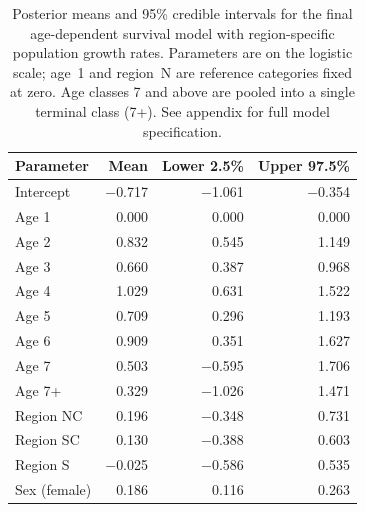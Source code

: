 
\begin{table}[!htbp]
  \centering
  \captionsetup{font=scriptsize}
  \caption{Posterior means and 95\% credible intervals for the final
    age-dependent survival model with region-specific population
    growth rates. Parameters are on the logistic scale; age~1 and
    region~N are reference categories fixed at zero. Age classes 7 and
    above are pooled into a single terminal class (7+). See appendix
    for full model specification.}
  \label{table:param}
  \scriptsize
  \begin{tabular}{lrrr}
    \toprule
    Parameter    & Mean     & Lower 2.5\% & Upper 97.5\% \\
    \midrule
    Intercept    & $-$0.717 & $-$1.061    & $-$0.354     \\
    \midrule
    Age 1        & 0.000    & 0.000       & 0.000        \\
    Age 2        & 0.832    & 0.545       & 1.149        \\
    Age 3        & 0.660    & 0.387       & 0.968        \\
    Age 4        & 1.029    & 0.631       & 1.522        \\
    Age 5        & 0.709    & 0.296       & 1.193        \\
    Age 6        & 0.909    & 0.351       & 1.627        \\
    Age 7        & 0.503    & $-$0.595    & 1.706        \\
    Age 7+       & 0.329    & $-$1.026    & 1.471        \\
    \midrule
    Region NC    & 0.196    & $-$0.348    & 0.731        \\
    Region SC    & 0.130    & $-$0.388    & 0.603        \\
    Region S     & $-$0.025 & $-$0.586    & 0.535        \\
    \midrule
    Sex (female) & 0.186    & 0.116       & 0.263        \\
    \bottomrule
  \end{tabular}
\end{table}

